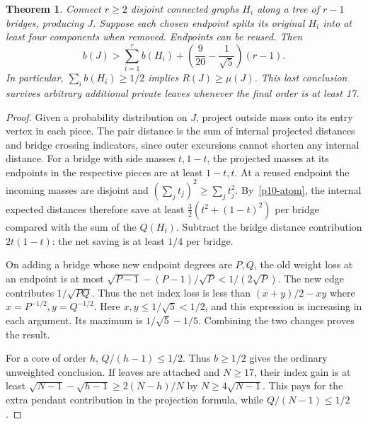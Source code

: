 \documentclass[11pt,a4paper]{article}
\newtheorem{theorem}{Theorem}[section]
\begin{document}
\begin{theorem}
Connect $r\ge2$ disjoint connected graphs $H_i$ along a tree of $r-1$
bridges, producing $J$. Suppose each chosen endpoint splits its
\emph{original} $H_i$ into at least four components when removed.
Endpoints can be reused. Then
\[
 b(J)>\sum_{i=1}^r b(H_i)
       +\left(\frac9{20}-\frac1{\sqrt5}\right)(r-1).
\]
In particular, $\sum_i b(H_i)\ge1/2$ implies $R(J)\ge\mu(J)$.
This last conclusion survives arbitrary additional private leaves
whenever the final order is at least 17.
\end{theorem}
\begin{proof}
Given a probability distribution on $J$, project outside mass onto its
entry vertex in each piece. The pair distance is the sum of internal
projected distances and bridge crossing indicators, since outer
excursions cannot shorten any internal distance. For a bridge with side
masses $t,1-t$, the projected masses at its endpoints in the respective
pieces are at least $1-t,t$. At a reused endpoint the incoming masses
are disjoint and $(\sum_j t_j)^2\ge\sum_j t_j^2$.
By~\eqref{p10-atom}, the internal expected distances therefore save at least
$\tfrac32(t^2+(1-t)^2)$ per bridge compared with the sum of the $Q(H_i)$.
Subtract the bridge distance contribution $2t(1-t)$: the net saving
is at least $1/4$ per bridge.

On adding a bridge whose new endpoint degrees are $P,Q$, the old
weight loss at an endpoint is at most
$\sqrt{P-1}-(P-1)/\sqrt P<1/(2\sqrt P)$.
The new edge contributes $1/\sqrt{PQ}$. Thus the net index loss is
less than $(x+y)/2-xy$ where $x=P^{-1/2},y=Q^{-1/2}$.
Here $x,y\le1/\sqrt5<1/2$, and this expression is increasing in each
argument. Its maximum is $1/\sqrt5-1/5$. Combining the two changes
proves the result.

For a core of order $h$, $Q/(h-1)\le1/2$. Thus $b\ge1/2$ gives the
ordinary unweighted conclusion. If leaves are attached and $N\ge17$,
their index gain is at least $\sqrt{N-1}-\sqrt{h-1}\ge2(N-h)/N$
by $N\ge4\sqrt{N-1}$. This pays for the extra pendant contribution
in the projection formula, while $Q/(N-1)\le1/2$.
\end{proof}
\end{document}
